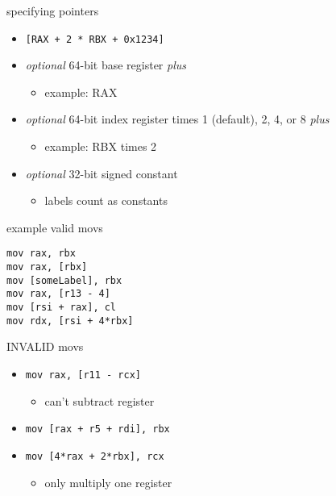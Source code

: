 \begin{frame}[fragile,label=specPtrs]{specifying pointers}
\begin{itemize}
\item \lstinline|[RAX + 2 * RBX + 0x1234]| 
\item \textit{optional} 64-bit base register \textit{plus}
    \begin{itemize}
    \item example: RAX
    \end{itemize}
\item \textit{optional} 64-bit index register times 1 (default), 2, 4, or 8 \textit{plus}
    \begin{itemize}
    \item example: RBX times 2
    \end{itemize}
\item \textit{optional} 32-bit signed constant
    \begin{itemize}
    \item labels count as constants
    \end{itemize}
\end{itemize}
\end{frame}

\begin{frame}[fragile,label=validMovs]{example valid movs}
\lstset{language=myasm}
\begin{lstlisting}
mov rax, rbx
mov rax, [rbx]
mov [someLabel], rbx
mov rax, [r13 - 4]
mov [rsi + rax], cl
mov rdx, [rsi + 4*rbx]
\end{lstlisting}
\end{frame}

\begin{frame}[fragile,label=invalidMovs]{INVALID movs}
\lstset{language=myasm}
\begin{itemize}
\item{} \lstinline|mov rax, [r11 - rcx]|
    \begin{itemize}
    \item can't subtract register
    \end{itemize}
\item{} \lstinline|mov [rax + r5 + rdi], rbx|
\item{} \lstinline|mov [4*rax + 2*rbx], rcx| 
    \begin{itemize}
    \item only multiply one register
    \end{itemize}
\end{itemize}
\end{frame}

